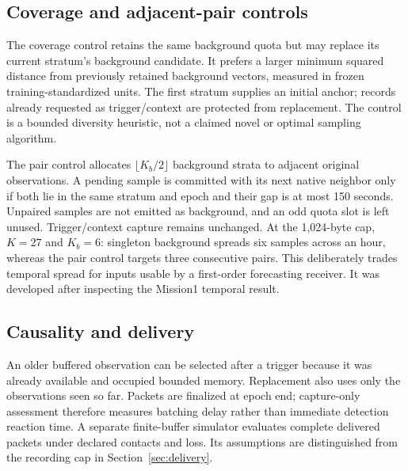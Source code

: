 \subsection{Coverage and adjacent-pair controls}
The coverage control retains the same background quota but may replace its current
stratum's background candidate. It prefers a larger minimum squared distance from
previously retained background vectors, measured in frozen training-standardized
units. The first stratum supplies an initial anchor; records already requested as
trigger/context are protected from replacement. The control is a bounded diversity
heuristic, not a claimed novel or optimal sampling algorithm.

The pair control allocates $\lfloor K_b/2\rfloor$ background strata to adjacent
original observations. A pending sample is committed with its next native neighbor
only if both lie in the same stratum and epoch and their gap is at most 150 seconds.
Unpaired samples are not emitted as background, and an odd quota slot is left
unused. Trigger/context capture remains unchanged. At the 1,024-byte cap,
$K=27$ and $K_b=6$: singleton background spreads six samples across an hour,
whereas the pair control targets three consecutive pairs. This deliberately trades
temporal spread for inputs usable by a first-order forecasting receiver. It was
developed after inspecting the Mission1 temporal result.

\subsection{Causality and delivery}
An older buffered observation can be selected after a trigger because it was
already available and occupied bounded memory. Replacement also uses only the
observations seen so far. Packets are finalized at epoch end; capture-only
assessment therefore measures batching delay rather than immediate detection
reaction time. A separate finite-buffer simulator evaluates complete delivered
packets under declared contacts and loss. Its assumptions are distinguished from
the recording cap in Section~\ref{sec:delivery}.
